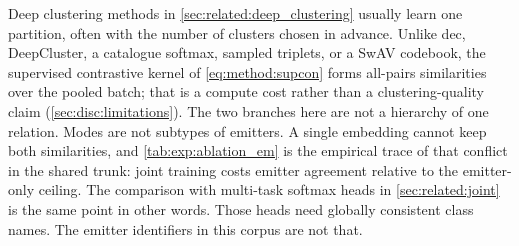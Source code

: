 Deep clustering methods in \cref{sec:related:deep_clustering} usually learn one partition, often with the number of clusters chosen in advance.
Unlike \gls{dec}, DeepCluster, a catalogue softmax, sampled triplets, or a SwAV codebook, the supervised contrastive kernel of \cref{eq:method:supcon} forms all-pairs similarities over the pooled batch; that is a compute cost rather than a clustering-quality claim (\cref{sec:disc:limitations}).
The two branches here are not a hierarchy of one relation. Modes are not subtypes of emitters.
A single embedding cannot keep both similarities, and \cref{tab:exp:ablation_em} is the empirical trace of that conflict in the shared trunk: joint training costs emitter agreement relative to the emitter-only ceiling.
The comparison with multi-task softmax heads in \cref{sec:related:joint} is the same point in other words. Those heads need globally consistent class names. The emitter identifiers in this corpus are not that.
